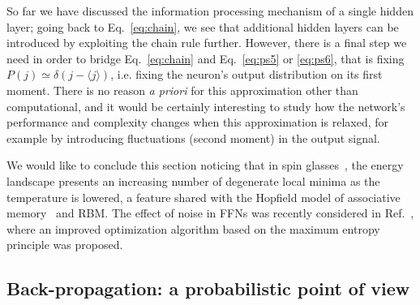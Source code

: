 \documentclass[5p]{elsarticle}
\begin{document}
	So far we have discussed the information processing mechanism of a single hidden layer; going back to Eq.~\eqref{eq:chain}, we see that additional hidden layers can be introduced by exploiting the chain rule further. However, there is a final step we need in order to bridge Eq.~\eqref{eq:chain} and Eq.~\eqref{eq:ps5}  or \eqref{eq:ps6}, that is fixing $P(j) \simeq \delta(j- \langle j \rangle)$, i.e. fixing the neuron's output distribution on its first moment. There is no reason {\it a priori}  for this approximation other than computational, and it would be certainly interesting to study how the network's performance and complexity changes when this approximation is relaxed, for example by introducing fluctuations (second moment) in the output signal.


	We would like to conclude this section noticing that in spin glasses~\cite{parisi2, giardina}, the energy landscape presents an increasing number of degenerate local minima as the temperature is lowered, a feature shared with the Hopfield model of associative memory~\cite{amit} and RBM. The effect of noise in FFNs was recently considered in Ref.~\cite{pratik}, where an improved optimization algorithm based on the maximum entropy principle was proposed.
\subsection{Back-propagation: a probabilistic point of view} \label{sub:back}
\end{document}
